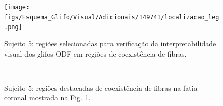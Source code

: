 \begin{figure}[H]
     \centering
     \texttt{[image: figs/Esquema\_Glifo/Visual/Adicionais/149741/localizacao\_leg.png]}
      \caption{Sujeito 5: regiões selecionadas para verificação da interpretabilidade visual dos glifos ODF em regiões de coexistência de fibras.}
       \label{fig::149741_localizacao}
 \end{figure}

\begin{figure}[H]
 \centering
    \\
    \caption{Sujeito 5: regiões destacadas de coexistência de fibras na fatia coronal mostrada na Fig. \ref{fig::149741_localizacao}.
    }
    \label{fig::149741}
\end{figure}



